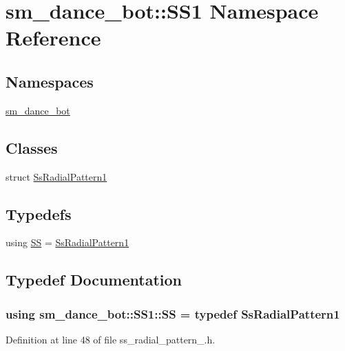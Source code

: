 \hypertarget{namespacesm__dance__bot_1_1SS1}{}\section{sm\+\_\+dance\+\_\+bot\+:\+:S\+S1 Namespace Reference}
\label{namespacesm__dance__bot_1_1SS1}
\subsection*{Namespaces}
\begin{DoxyCompactItemize}
\item 
 \hyperlink{namespacesm__dance__bot_1_1SS1_1_1sm__dance__bot}{sm\+\_\+dance\+\_\+bot}
\end{DoxyCompactItemize}
\subsection*{Classes}
\begin{DoxyCompactItemize}
\item 
struct \hyperlink{structsm__dance__bot_1_1SS1_1_1SsRadialPattern1}{Ss\+Radial\+Pattern1}
\end{DoxyCompactItemize}
\subsection*{Typedefs}
\begin{DoxyCompactItemize}
\item 
using \hyperlink{namespacesm__dance__bot_1_1SS1_a84fc38da71be89ddc4805298f7b82c66}{SS} = \hyperlink{structsm__dance__bot_1_1SS1_1_1SsRadialPattern1}{Ss\+Radial\+Pattern1}
\end{DoxyCompactItemize}


\subsection{Typedef Documentation}
\subsubsection[{\texorpdfstring{SS}{SS}}]{\setlength{\rightskip}{0pt plus 5cm}using {\bf sm\+\_\+dance\+\_\+bot\+::\+S\+S1\+::\+SS} = typedef {\bf Ss\+Radial\+Pattern1}}\hypertarget{namespacesm__dance__bot_1_1SS1_a84fc38da71be89ddc4805298f7b82c66}{}\label{namespacesm__dance__bot_1_1SS1_a84fc38da71be89ddc4805298f7b82c66}


Definition at line 48 of file ss\+\_\+radial\+\_\+pattern\+\_.\+h.

